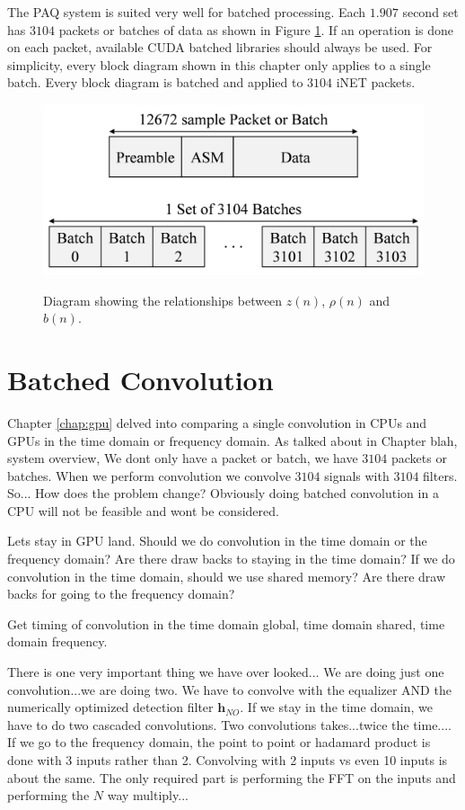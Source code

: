 The PAQ system is suited very well for batched processing.
Each $1.907$ second set has $3104$ packets or batches of data as shown in Figure \ref{fig:packet_batch_set}.
If an operation is done on each packet, available CUDA batched libraries should always be used.
For simplicity, every block diagram shown in this chapter only applies to a single batch.
Every block diagram is batched and applied to $3104$ iNET packets.
\begin{figure}
	\caption{Diagram showing the relationships between $z(n)$, $\rho(n)$ and $b(n)$.}
	\centering\includegraphics[width=5.94in/100*55]{figures/eq_GPUimplementation/packet_batch_set.pdf}
	\label{fig:packet_batch_set}
\end{figure}


\section{Batched Convolution}
Chapter \ref{chap:gpu} delved into comparing a single convolution in CPUs and GPUs in the time domain or frequency domain.
As talked about in Chapter blah, system overview, We dont only have a packet or batch, we have $3104$ packets or batches.
When we perform convolution we convolve $3104$ signals with $3104$ filters.
So...
How does the problem change?
Obviously doing batched convolution in a CPU will not be feasible and wont be considered.

Lets stay in GPU land.
Should we do convolution in the time domain or the frequency domain?
Are there draw backs to staying in the time domain? 
If we do convolution in the time domain, should we use shared memory?
Are there draw backs for going to the frequency domain? 

Get timing of convolution in the time domain global, time domain shared, time domain frequency.

There is one very important thing we have over looked...
We are doing just one convolution...we are doing two.
We have to convolve with the equalizer AND the numerically optimized detection filter $\mathbf{h}_{NO}$.
If we stay in the time domain, we have to do two cascaded convolutions.
Two convolutions takes...twice the time....
If we go to the frequency domain, the point to point or hadamard product is done with 3 inputs rather than 2.
Convolving with 2 inputs vs even 10 inputs is about the same.
The only required part is performing the FFT on the inputs and performing the $N$ way multiply...

